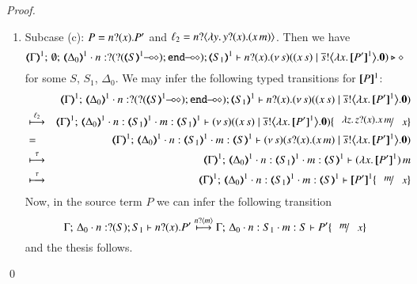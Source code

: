 \begin{proof}
\begin{enumerate}[1.]
	\item	Subcase (c): $P = n ? (x) . P'$ and $\ell_2 = n ? \langle \lambda y.\,y ? (x) . (x\, {m}) \rangle$.
		Then we have
%
		\[
			\mapt{\Gamma}^{1};\, \emptyset;\, \mapt{\Delta_0}^{1} \cat 
			n: \btinp{\lhot{\btinp{\lhot{\tmap{S}{1}}}\tinact}} \tmap{S_1}{1}
			\proves
			\binp{n}{x} \newsp{s}{(\appl{x}{s})
			\Par 
			\bbout{\dual{s}}{\abs{x}{\pmap{P'}{1}}} \inact}
			\hastype \Proc
		\]
%
		for some $S$, $S_1$, $\Delta_0$.
		We may infer the following typed transitions for $[\!\![P]\!\!]^1$:
%
		\begin{eqnarray*}
			& & 
			\mapt{\Gamma}^{1};\, %
			\mapt{\Delta_0}^{1} \cat 
			n: \btinp{\lhot{\btinp{\lhot{\tmap{S}{1}}}\tinact}} \tmap{S_1}{1}
			\proves
			\binp{n}{x} \newsp{s}{(\appl{x}{s}) 
							\Par 
							\bbout{\dual{s}}{\abs{x}{\pmap{P'}{1}}} \inact} \\
			& \hby{\ell_2} & 
			\mapt{\Gamma}^{1};\, %
			\mapt{\Delta_0}^{1} \cat 
			n:\tmap{S_1}{1}
			\cat m:\tmap{S_1}{1}
			\proves
			\newsp{s}{(\appl{x}{s}) 
				\Par 
				\bbout{\dual{s}}{\abs{x}{\pmap{P'}{1}}} \inact} \subst{\abs{z}\binp{z}{x}\appl{x}{m}}{x} \\
			& = & 
			\mapt{\Gamma}^{1};\, %
			\mapt{\Delta_0}^{1} 
			\cat n:\tmap{S_1}{1}
			\cat m:\tmap{S}{1}
			\proves
			\newsp{s}{\binp{s}{x}(\appl{x}{m}) 
				\Par 
				\bbout{\dual{s}}{\abs{x}{\pmap{P'}{1}}} \inact}  \\
			& \hby{\tau} & 
			\mapt{\Gamma}^{1};\, %
			\mapt{\Delta_0}^{1} 
			\cat n:\tmap{S_1}{1}
			\cat m:\tmap{S}{1}
			\proves
			\appl{(\abs{x}{\pmap{P'}{1}})}{m}   \\
			& \hby{\tau} & 
			\mapt{\Gamma}^{1};\, %
			\mapt{\Delta_0}^{1} 
			\cat n:\tmap{S_1}{1}
			\cat m:\tmap{S}{1}
			\proves
			\pmap{P'}{1}\subst{m}{x}   
		\end{eqnarray*}
%
		Now, in the source term $P$ we can infer the following transition 
%
		\[
			\Gamma;\,  \Delta_0 \cat n:\btinp{S} S_1 \proves \binp{n}{x} P'
			\hby{\bactinp{n}{m}} 
			\Gamma;\,  \Delta_0 \cat n: S_1 \cat m: S \proves P'\subst{m}{x}
		\]
%
		and the thesis follows.

%
\end{enumerate}
\qed
\end{proof}


